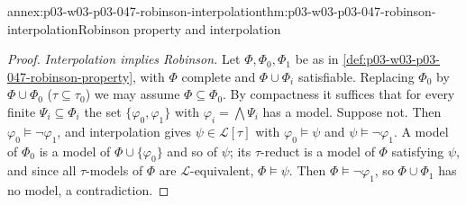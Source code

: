 \begin{annexitem}{annex:p03-w03-p03-047-robinson-interpolation}{thm:p03-w03-p03-047-robinson-interpolation}{Robinson property and interpolation}
\begin{proof}
\emph{Interpolation implies Robinson.}  Let \(\Phi,\Phi_0,\Phi_1\) be as in
\cref{def:p03-w03-p03-047-robinson-property}, with \(\Phi\) complete and
\(\Phi\cup\Phi_i\) satisfiable.  Replacing \(\Phi_0\) by \(\Phi\cup\Phi_0\)
(\(\tau\subseteq\tau_0\)) we may assume \(\Phi\subseteq\Phi_0\).  By
compactness it suffices that for every finite \(\Psi_i\subseteq\Phi_i\) the
set \(\{\varphi_0,\varphi_1\}\) with \(\varphi_i=\bigwedge\Psi_i\) has a
model.  Suppose not.  Then \(\varphi_0\models\neg\varphi_1\), and
interpolation gives \(\psi\in\mathscr L[\tau]\) with \(\varphi_0\models\psi\)
and \(\psi\models\neg\varphi_1\).  A model of \(\Phi_0\) is a model of
\(\Phi\cup\{\varphi_0\}\) and so of \(\psi\); its \(\tau\)-reduct is a model
of \(\Phi\) satisfying \(\psi\), and since all \(\tau\)-models of \(\Phi\)
are \(\mathscr L\)-equivalent, \(\Phi\models\psi\).  Then
\(\Phi\models\neg\varphi_1\), so \(\Phi\cup\Phi_1\) has no model, a
contradiction.
\end{proof}
\end{annexitem}

